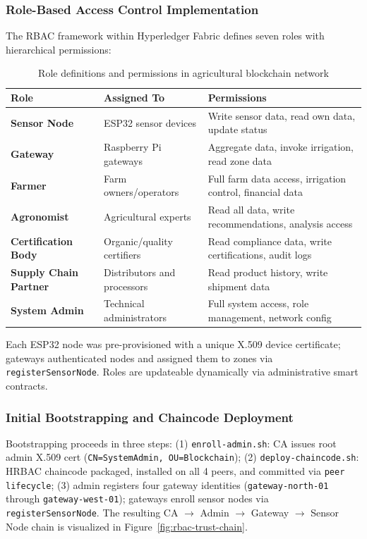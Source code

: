 \documentclass[pdflatex,sn-mathphys-num]{sn-jnl}
\theoremstyle{thmstyleone}
\theoremstyle{thmstyletwo}
\theoremstyle{thmstylethree}
\begin{document}
\subsubsection{Role-Based Access Control Implementation}
\label{subsubsec:rbac_implementation}

The RBAC framework within Hyperledger Fabric defines seven roles with hierarchical permissions:

\begin{table}[htbp]
\centering
\caption{Role definitions and permissions in agricultural blockchain network}
\label{tab:role-definitions}
\begin{tabularx}{\textwidth}{p{}p{}X}
\toprule
\textbf{Role} & \textbf{Assigned To} & \textbf{Permissions} \\
\midrule
\textbf{Sensor Node} & ESP32 sensor devices & Write sensor data, read own data, update status \\
\textbf{Gateway} & Raspberry Pi gateways & Aggregate data, invoke irrigation, read zone data \\
\textbf{Farmer} & Farm owners/operators & Full farm data access, irrigation control, financial data \\
\textbf{Agronomist} & Agricultural experts & Read all data, write recommendations, analysis access \\
\textbf{Certification Body} & Organic/quality certifiers & Read compliance data, write certifications, audit logs \\
\textbf{Supply Chain Partner} & Distributors and processors & Read product history, write shipment data \\
\textbf{System Admin} & Technical administrators & Full system access, role management, network config \\
\bottomrule
\end{tabularx}
\end{table}

Each ESP32 node was pre-provisioned with a unique X.509 device certificate; gateways authenticated nodes and assigned them to zones via \texttt{registerSensorNode}. Roles are updateable dynamically via administrative smart contracts.

\subsubsection{Initial Bootstrapping and Chaincode Deployment}
\label{subsubsec:rbac_bootstrapping}

Bootstrapping proceeds in three steps: (1) \texttt{enroll-admin.sh}: CA issues root admin X.509 cert (\texttt{CN=SystemAdmin, OU=Blockchain}); (2) \texttt{deploy-chaincode.sh}: HRBAC chaincode packaged, installed on all 4 peers, and committed via \texttt{peer lifecycle}; (3) admin registers four gateway identities (\texttt{gateway-north-01} through \texttt{gateway-west-01}); gateways enroll sensor nodes via \texttt{registerSensorNode}. The resulting CA $\rightarrow$ Admin $\rightarrow$ Gateway $\rightarrow$ Sensor Node chain is visualized in Figure~\ref{fig:rbac-trust-chain}.
\end{document}
